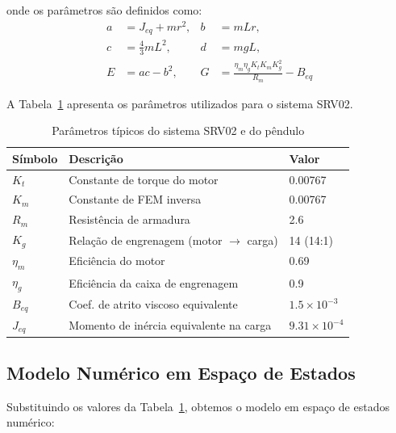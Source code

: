 \documentclass[9pt,a4paper,twocolumn,twoside]{tau-class/tau}
\begin{document}
onde os parâmetros são definidos como:
\begin{align*}
a &= J_{eq} + mr^2, & b &= mLr, \\
c &= \tfrac{4}{3} mL^2, & d &= mgL, \\
E &= ac - b^2, & G &= \tfrac{\eta_m \eta_g K_t K_m K_g^2}{R_m} - B_{eq}
\end{align*}

A Tabela~\ref{tab:parametros} apresenta os parâmetros utilizados para o sistema SRV02.

\begin{table}[H]
\centering
\caption{Parâmetros típicos do sistema SRV02 e do pêndulo}
\label{tab:parametros}
\begin{tabular}{lll}
\toprule
\textbf{Símbolo} & \textbf{Descrição} & \textbf{Valor} \\
\midrule
$K_t$   & Constante de torque do motor            & 0.00767 \\
$K_m$   & Constante de FEM inversa                & 0.00767 \\
$R_m$   & Resistência de armadura                 & 2.6 \\
$K_g$   & Relação de engrenagem (motor $\rightarrow$ carga) & 14 (14:1) \\
$\eta_m$ & Eficiência do motor                    & 0.69 \\
$\eta_g$ & Eficiência da caixa de engrenagem      & 0.9 \\
$B_{eq}$ & Coef. de atrito viscoso equivalente    & $1.5 \times 10^{-3}$ \\
$J_{eq}$ & Momento de inércia equivalente na carga & $9.31 \times 10^{-4}$ \\
\bottomrule
\end{tabular}
\end{table}

\subsection{Modelo Numérico em Espaço de Estados}

Substituindo os valores da Tabela~\ref{tab:parametros}, obtemos o modelo em espaço de estados numérico:
\end{document}
